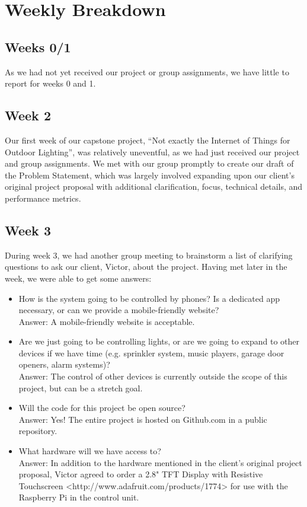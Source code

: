 \documentclass[letterpaper,10pt]{article}
\begin{document}
\pagebreak

\section{Weekly Breakdown}

\subsection{Weeks 0/1}

As we had not yet received our project or group assignments, we have little to
report for weeks 0 and 1.

\subsection{Week 2}

Our first week of our capstone project, ``Not exactly the Internet of Things
for Outdoor Lighting'', was relatively uneventful, as we had just received our
project and group assignments.  We met with our group promptly to create our
draft of the Problem Statement, which was largely involved expanding upon our
client's original project proposal with additional clarification, focus,
technical details, and performance metrics.

\subsection{Week 3}

During week 3, we had another group meeting to brainstorm a list of clarifying
questions to ask our client, Victor, about the project.  Having met later in
the week, we were able to get some answers:

\begin{itemize}
    \item How is the system going to be controlled by phones?  Is a dedicated
        app necessary, or can we provide a mobile-friendly website?\\ Answer: A
        mobile-friendly website is acceptable.
    \item Are we just going to be controlling lights, or are we going to expand
        to other devices if we have time (e.g. sprinkler system, music players,
        garage door openers, alarm systems)?\\
        Answer: The control of other devices is currently outside the scope of
        this project, but can be a stretch goal.
    \item Will the code for this project be open source?\\
        Answer: Yes!  The entire project is hosted on Github.com in a public
        repository.
    \item What hardware will we have access to?\\
        Answer: In addition to the hardware mentioned in the client's original
        project proposal, Victor agreed to order a 2.8" TFT Display with
        Resistive Touchscreen <http://www.adafruit.com/products/1774> for use
        with the Raspberry Pi in the control unit.
\end{itemize}
\end{document}
